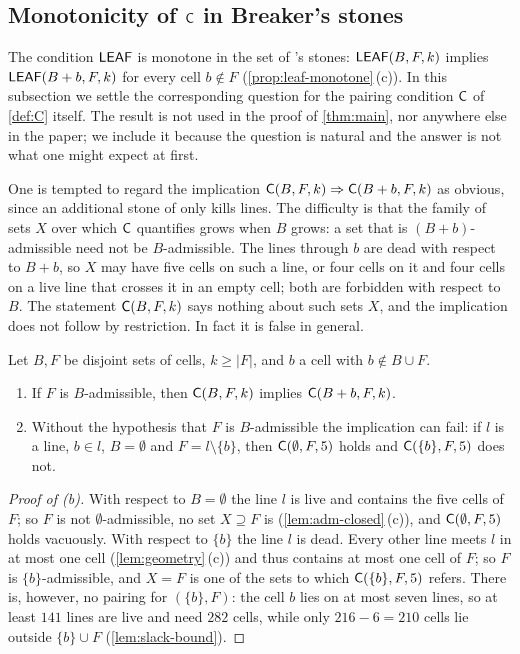 
\subsection{Monotonicity of \texorpdfstring{$\CC$}{C} in Breaker's stones}\label{sec:extra-monoC}

The condition $\mathsf{LEAF}$ is monotone in the set of \Breaker's stones: $\mathsf{LEAF}(B,F,k)$ implies
$\mathsf{LEAF}(B+b,F,k)$ for every cell $b\notin F$ (\cref{prop:leaf-monotone}\,(c)). In this subsection we settle
the corresponding question for the pairing condition $\CC$ of \cref{def:C} itself. The result is not used in
the proof of \cref{thm:main}, nor anywhere else in the paper; we include it because the question is
natural and the answer is not what one might expect at first.

One is tempted to regard the implication $\mathsf{C}(B,F,k)\Rightarrow\mathsf{C}(B+b,F,k)$ as obvious, since an
additional stone of \Breaker{} only kills lines. The difficulty is that the family of sets $X$ over
which $\CC$ quantifies grows when $B$ grows: a set that is $(B+b)$-admissible need not be $B$-admissible.
The lines through $b$ are dead with respect to $B+b$, so $X$ may have five cells on such a line, or four
cells on it and four cells on a live line that crosses it in an empty cell; both are forbidden with
respect to $B$. The statement $\mathsf{C}(B,F,k)$ says nothing about such sets $X$, and the implication does
not follow by restriction. In fact it is false in general.

\begin{proposition}[Monotonicity of $\CC$ in $B$]\label{prop:C-monotone}
Let $B,F$ be disjoint sets of cells, $k\ge|F|$, and $b$ a cell with $b\notin B\cup F$.
\begin{enumerate}[label=\textup{(\alph*)}]
\item If $F$ is $B$-admissible, then $\mathsf{C}(B,F,k)$ implies $\mathsf{C}(B+b,F,k)$.
\item Without the hypothesis that $F$ is $B$-admissible the implication can fail: if $l$ is a line,
      $b\in l$, $B=\emptyset$ and $F=l\setminus\{b\}$, then $\mathsf{C}(\emptyset,F,5)$ holds and
      $\mathsf{C}(\{b\},F,5)$ does not.
\end{enumerate}
\end{proposition}

\begin{proof}[Proof of \textup{(b)}]
With respect to $B=\emptyset$ the line $l$ is live and contains the five cells of $F$; so $F$ is not
$\emptyset$-admissible, no set $X\supseteq F$ is (\cref{lem:adm-closed}\,(c)), and $\mathsf{C}(\emptyset,F,5)$ holds
vacuously. With respect to $\{b\}$ the line $l$ is dead. Every other line meets $l$ in at most one cell
(\cref{lem:geometry}\,(c)) and thus contains at most one cell of $F$; so $F$ is $\{b\}$-admissible, and
$X=F$ is one of the sets to which $\mathsf{C}(\{b\},F,5)$ refers. There is, however, no pairing for $(\{b\},F)$: the cell
$b$ lies on at most seven lines, so at least $141$ lines are live and need $282$ cells, while only
$216-6=210$ cells lie outside $\{b\}\cup F$ (\cref{lem:slack-bound}).
\end{proof}

